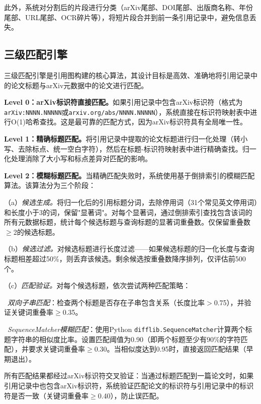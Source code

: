 此外，系统对分割后的片段进行分类（arXiv尾部、DOI尾部、出版商名称、年份尾部、URL尾部、OCR碎片等），将短片段合并到前一条引用记录中，避免信息丢失。

\subsection{三级匹配引擎}

三级匹配引擎是引用图构建的核心算法，其设计目标是高效、准确地将引用记录中的论文标题与arXiv元数据中的论文进行匹配。

\textbf{Level 0：arXiv标识符直接匹配。}如果引用记录中包含arXiv标识符（格式为\texttt{arXiv:NNNN.NNNNN}或\texttt{arxiv.org/abs/NNNN.NNNNN}），系统直接在标识符映射表中进行O(1)哈希查找。这是最可靠的匹配方式，因为arXiv标识符具有全局唯一性。

\textbf{Level 1：精确标题匹配。}将引用记录中提取的论文标题进行归一化处理（转小写、去除标点、统一空白字符），然后在标题-标识符映射表中进行精确查找。归一化处理消除了大小写和标点差异对匹配的影响。

\textbf{Level 2：模糊标题匹配。}当精确匹配失败时，系统使用基于倒排索引\cite{zobel2006inverted, manning2008ir}的模糊匹配算法。该算法分为三个阶段：

（a）\textit{候选生成。}将归一化后的引用标题分词，去除停用词（31个常见英文停用词）和长度小于3的词，保留"显著词"。对每个显著词，通过倒排索引查找包含该词的所有元数据标题，统计每个候选标题与查询标题的显著词重叠数。仅保留重叠数$\geq$2的候选标题。

（b）\textit{候选过滤。}对候选标题进行长度过滤——如果候选标题的归一化长度与查询标题相差超过50\%，则丢弃该候选。剩余候选按重叠数降序排列，仅评估前500个。

（c）\textit{匹配验证。}对每个候选标题，依次尝试两种匹配策略：

\hspace{1em}\textbullet~\textit{双向子串匹配}：检查两个标题是否存在子串包含关系（长度比率$>$0.75），并验证关键词重叠率$\geq$0.35。

\hspace{1em}\textbullet~\textit{SequenceMatcher模糊匹配}\cite{ratcliff1988gestalt}：使用Python \texttt{difflib.SequenceMatcher}计算两个标题字符串的相似度比率。设置匹配阈值为0.90（即两个标题至少有90\%的字符匹配），并要求关键词重叠率$\geq$0.30。当相似度达到0.95时，直接返回匹配结果（早期退出）。

所有匹配结果都经过arXiv标识符交叉验证：当通过标题匹配到一篇论文时，如果引用记录中也包含arXiv标识符，系统验证匹配论文的标识符与引用记录中的标识符是否一致（关键词重叠率$\geq$0.40），防止误匹配。

